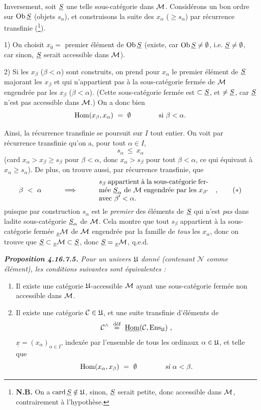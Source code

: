 Inversement, soit $\underline{S}$ une telle sous-catégorie dans $\mathcal{M}$. Considérons un bon ordre sur $\operatorname{Ob} \underline{S}$ (objets $s_\alpha$), et construisons la suite des $x_\alpha$ ($\geqslant s_\alpha$) par récurrence transfinie (\footnote{\textbf{N.B.} On a $\operatorname{card} \underline{S} \notin \mathfrak{U}$, sinon, $\underline{S}$ serait petite, donc accessible dans $\mathcal{M}$, contrairement à l'hypothèse.}).

1) On choisit $x_0 =$ premier élément de $\operatorname{Ob} \underline{S}$ (existe, car $\operatorname{Ob} \underline{S} \neq \emptyset$, i.e. $\underline{S} \neq \emptyset$, car sinon, $\underline{S}$ serait accessible dans $\mathcal{M}$).

2) Si les $x_\beta$ ($\beta < \alpha$) sont construits, on prend pour $x_\alpha$ le premier élément de $\underline{S}$ majorant les $x_\beta$ et qui n'appartient pas à la sous-catégorie fermée de $\mathcal{M}$ engendrée par les $x_\beta$ ($\beta < \alpha$). (Cette sous-catégorie fermée est $\subset \underline{S}$, et $\neq \underline{S}$, car $\underline{S}$ n'est pas accessible dans $\mathcal{M}$.) On a donc bien
\[
\operatorname{Hom}(x_\beta, x_\alpha) \ =\ \emptyset \qquad\qquad \text{si } \beta < \alpha.
\]


Ainsi, la récurrence transfinie se poursuit sur $I$ tout entier. On voit par récurrence transfinie qu'on a, pour tout $\alpha \in I$,
\[
s_\alpha \ \leqslant\ x_\alpha
\]
(card $x_\alpha > x_\beta \geqslant s_\beta$ pour $\beta < \alpha$, donc $x_\alpha > s_\beta$ pour tout $\beta < \alpha$, ce qui équivaut à $x_\alpha \geqslant s_\alpha$). De plus, on trouve aussi, par récurrence transfinie, que
\[
\beta \ <\ \alpha \qquad\quad \Longrightarrow \qquad\quad
\text{\parbox[c]{5.5cm}{$s_\beta$ appartient à la sous-catégorie fermée $\uS_\alpha$ de $\cM$ engendrée par les $x_{\beta'}$ avec $\beta' < \alpha$.}}
\quad ,
\tag*{$(*)$}
\]
puisque par construction $s_\alpha$ est le \textit{premier} des éléments de $\underline{S}$ qui n'est \textit{pas} dans ladite sous-catégorie $\underline{S}_\alpha$ de $\mathcal{M}$. Cela montre que tout $s_\beta$ appartient à la sous-catégorie fermée ${}_{\underline{x}}\mathcal{M}$ de $\mathcal{M}$ engendrée par la famille de \textit{tous} les $x_\alpha$, donc on trouve que $\underline{S} \subset {}_{\underline{x}}\mathcal{M} \subset \underline{S}$, donc $\underline{S} = {}_{\underline{x}}\mathcal{M}$, q.e.d.

\begingroup\itshape
\noindent\textbf{\upshape Proposition 4.16.7.5.} Pour un univers $\mathfrak{U}$ donné (contenant $\mathcal{N}$ comme élément), les conditions suivantes sont équivalentes :
\begin{enumerate}[label={}]
\item[1)] Il existe une catégorie $\mathfrak{U}$-accessible $\mathcal{M}$ ayant une sous-catégorie fermée non accessible %
dans $\mathcal{M}$.
\item[b)] Il existe une catégorie $\mathcal{C} \in \mathfrak{U}$, et une suite transfinie d'éléments de
\[
\cC^\wedge \ \overset{\text{\upshape déf}}{=}\ \underline{\mathrm{Hom}}(\cC, \mathrm{Ens}_{\U}) \ ,
\]
$\underline{x} = (x_\alpha)_{\alpha\in I}$, indexée par l'ensemble de tous les ordinaux $\alpha \in \mathfrak{U}$, et telle que
\[
\operatorname{Hom}(x_\alpha, x_\beta) \ =\ \emptyset \qquad\qquad \textit{si } \alpha < \beta.
\]
\end{enumerate}
\endgroup

